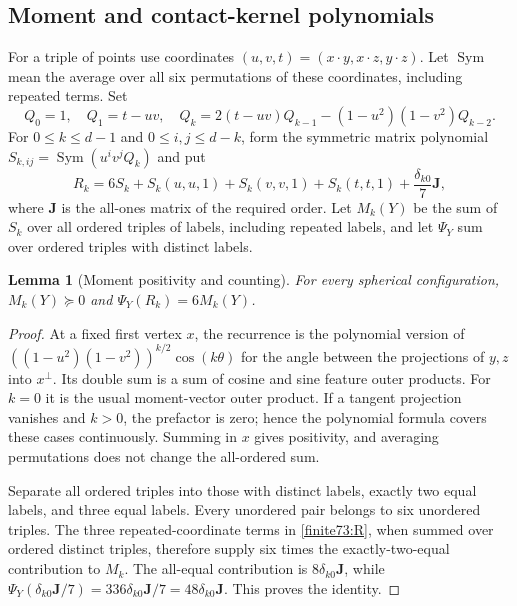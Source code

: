 \documentclass[12pt,reqno]{amsart}
\newtheorem{lemma}[theorem]{Lemma}
\theoremstyle{definition}
\numberwithin{equation}{section}
\begin{document}
\subsection{Moment and contact-kernel polynomials}
For a triple of points use coordinates $(u,v,t)=(x\cdot y,x\cdot z,y\cdot z)$. Let $\operatorname{Sym}$ mean the average over all six permutations of these coordinates, including repeated terms. Set
\begin{equation}\label{finite73:Q}
 Q_0=1,\quad Q_1=t-uv,\quad
 Q_k=2(t-uv)Q_{k-1}-(1-u^2)(1-v^2)Q_{k-2}.
\end{equation}
For $0\leq k\leq d-1$ and $0\leq i,j\leq d-k$, form the symmetric matrix polynomial
$S_{k,ij}=\operatorname{Sym}(u^iv^jQ_k)$ and put
\begin{equation}\label{finite73:R}
 R_k=6S_k+S_k(u,u,1)+S_k(v,v,1)+S_k(t,t,1)
       +\frac{\delta_{k0}}7\mathbf J,
\end{equation}
where $\mathbf J$ is the all-ones matrix of the required order. Let $M_k(Y)$ be the sum of $S_k$ over all ordered triples of labels, including repeated labels, and let $\Psi_Y$ sum over ordered triples with distinct labels.

\begin{lemma}[Moment positivity and counting]\label{finite73:moment}
For every spherical configuration, $M_k(Y)\succeq0$ and $\Psi_Y(R_k)=6M_k(Y)$.
\end{lemma}
\begin{proof}
At a fixed first vertex $x$, the recurrence is the polynomial version of
$((1-u^2)(1-v^2))^{k/2}\cos(k\theta)$ for the angle between the projections of $y,z$ into $x^\perp$. Its double sum is a sum of cosine and sine feature outer products. For $k=0$ it is the usual moment-vector outer product. If a tangent projection vanishes and $k>0$, the prefactor is zero; hence the polynomial formula covers these cases continuously. Summing in $x$ gives positivity, and averaging permutations does not change the all-ordered sum.

Separate all ordered triples into those with distinct labels, exactly two equal labels, and three equal labels. Every unordered pair belongs to six unordered triples. The three repeated-coordinate terms in \eqref{finite73:R}, when summed over ordered distinct triples, therefore supply six times the exactly-two-equal contribution to $M_k$. The all-equal contribution is $8\delta_{k0}\mathbf J$, while $\Psi_Y(\delta_{k0}\mathbf J/7)=336\delta_{k0}\mathbf J/7=48\delta_{k0}\mathbf J$. This proves the identity.
\end{proof}
\end{document}

